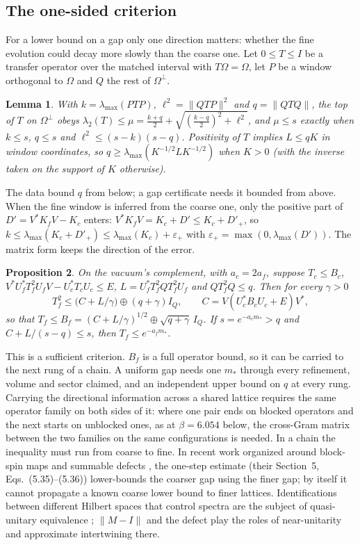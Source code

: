 \documentclass[11pt]{article}
\newtheorem{lemma}{Lemma}
\newtheorem{proposition}[lemma]{Proposition}
\newcommand{\eps}{\varepsilon}
\newcommand{\lmax}{\lambda_{\max}}
\begin{document}
\subsection{The one-sided criterion}

For a lower bound on a gap only one direction matters: whether the fine evolution could decay more
slowly than the coarse one. Let $0\le T\le I$ be a transfer operator over the matched interval with
$T\Omega=\Omega$, let $P$ be a window orthogonal to $\Omega$ and $Q$ the rest of $\Omega^\perp$.

\begin{lemma}\label{lem:onesided}
With $k=\lmax(PTP)$, $\ell^2=\|QTP\|^2$ and $q=\|QTQ\|$, the top of $T$ on $\Omega^\perp$ obeys
$\lambda_2(T)\le\mu=\tfrac{k+q}{2}+\sqrt{(\tfrac{k-q}{2})^2+\ell^2}$, and $\mu\le s$ exactly when $k\le s$,
$q\le s$ and $\ell^2\le(s-k)(s-q)$. Positivity of $T$ implies $L\le qK$ in window coordinates, so
$q\ge\lmax(K^{-1/2}LK^{-1/2})$ when $K>0$ (with the inverse taken on the support of $K$ otherwise).
\end{lemma}

The data bound $q$ from below; a gap certificate needs it bounded from above. When the fine window is
inferred from the coarse one, only the positive part of $D'=V^*K_fV-K_c$ enters: $V^*K_fV=K_c+D'\le
K_c+D'_+$, so $k\le\lmax(K_c+D'_+)\le\lmax(K_c)+\eps_+$ with $\eps_+=\max(0,\lmax(D'))$. The matrix form
keeps the direction of the error.

\begin{proposition}\label{prop:chain}
On the vacuum's complement, with $a_c=2a_f$, suppose $T_c\le B_c$, $V^*U_f^*T_f^2U_fV-U_c^*T_cU_c\le E$,
$L=U_f^*T_f^2QT_f^2U_f$ and $QT_f^2Q\le q$. Then for every $\gamma>0$
\begin{equation}
 T_f^2\le\bigl(C+L/\gamma\bigr)\oplus(q+\gamma)I_Q,\qquad C=V(U_c^*B_cU_c+E)V^*,
\end{equation}
so that $T_f\le B_f=(C+L/\gamma)^{1/2}\oplus\sqrt{q+\gamma}\,I_Q$. If $s=e^{-a_cm_*}>q$ and $C+L/(s-q)\le s$,
then $T_f\le e^{-a_fm_*}$.
\end{proposition}

This is a sufficient criterion. $B_f$ is a full operator bound, so it can be carried to the next rung of a
chain. A uniform gap needs one $m_*$ through every refinement, volume and sector claimed, and an
independent upper bound on $q$ at every rung. Carrying the directional information across a shared
lattice requires the same operator family on both sides of it: where one pair ends on blocked operators
and the next starts on unblocked ones, as at $\beta=6.054$ below, the cross-Gram matrix between the two
families on the same configurations is needed. In a chain the inequality must run from coarse to fine.
In recent work organized around block-spin maps and summable defects \cite{FaizalShabir2026}, the
one-step estimate (their Section~5, Eqs.~(5.35)--(5.36)) lower-bounds the coarser gap using the finer
gap; by itself it cannot propagate a known coarse lower bound to finer lattices. Identifications between different Hilbert
spaces that control spectra are the subject of quasi-unitary equivalence \cite{Post2012,PostSimmer};
$\|M-I\|$ and the defect play the roles of near-unitarity and approximate intertwining there.
\end{document}
